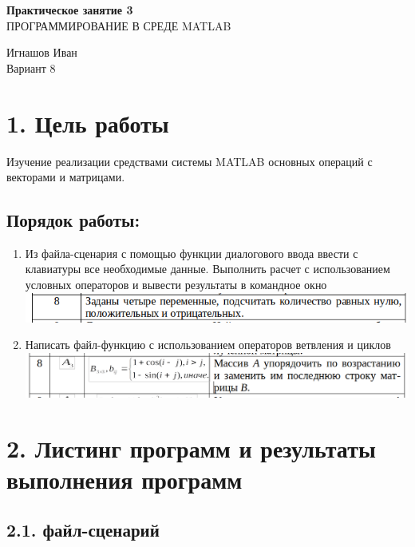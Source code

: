 \documentclass[12pt]{article}
\begin{document}
\begin{center}
	\LARGE 
	\textbf{Практическое занятие 3}\\
	ПРОГРАММИРОВАНИЕ В СРЕДЕ MATLAB\\
\end{center}

\begin{flushright}
	\large
	Игнашов Иван\\
	Вариант 8\\
\end{flushright}

\newpage

 \section*{1. Цель работы}
Изучение реализации средствами системы MATLAB основных операций с векторами и матрицами.
\subsection*{Порядок работы:}
\begin{enumerate}
	\item Из файла-сценария с помощью функции диалогового ввода ввести с клавиатуры все необходимые данные. Выполнить расчет с использованием условных операторов и вывести результаты в командное окно\\
		\includegraphics[width=0.75\linewidth]{formula.png}
	\item Написать файл-функцию с использованием операторов ветвления и циклов\\
		\includegraphics[width=0.75\linewidth]{formula2.png}
\end{enumerate}

\newpage
 \section*{2. Листинг программ и результаты выполнения программ}%
 
 \subsection*{2.1. файл-сценарий}
 
\end{document}
